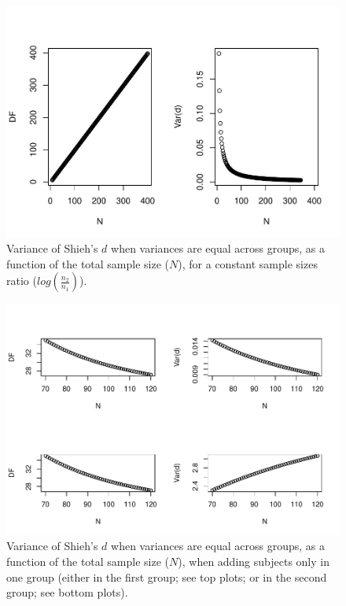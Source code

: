 \documentclass[
  english,
  man,mask]{apa6}
\begin{document}
\begin{figure}
\centering
\includegraphics{Theoretical-Variance-of-all-estimators-as-a-function-of-population-parameters_files/figure-latex/varshiehhomNsize2-1.pdf}
\caption{\label{fig:varshiehhomNsize2}Variance of Shieh's \(d\) when variances are equal across groups, as a function of the total sample size (\(N\)), for a constant sample sizes ratio (\(log\left(\frac{n_2}{n_1} \right)\)).}
\end{figure}

\begin{figure}
\centering
\includegraphics{Theoretical-Variance-of-all-estimators-as-a-function-of-population-parameters_files/figure-latex/varshiehhomNsize4-1.pdf}
\caption{\label{fig:varshiehhomNsize4}Variance of Shieh's \(d\) when variances are equal across groups, as a function of the total sample size (\(N\)), when adding subjects only in one group (either in the first group; see top plots; or in the second group; see bottom plots).}
\end{figure}
\end{document}
